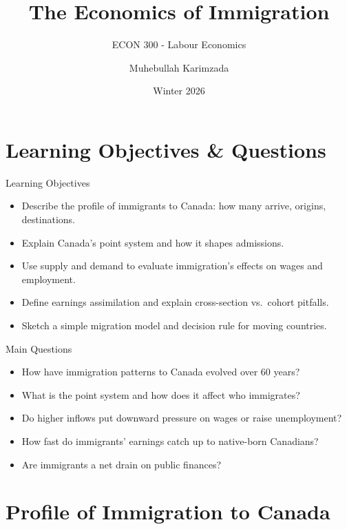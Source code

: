 \documentclass[aspectratio=169]{beamer}
\title{\textbf{The Economics of Immigration  \vspace{.5cm}\\  }}
\subtitle{ {\large ECON 300 - Labour Economics}}
\author{Muhebullah Karimzada}
\date{Winter 2026}
\begin{document}
\begin{frame}[plain]
  \titlepage
\end{frame}

\section{Learning Objectives \& Questions}

\begin{frame}{Learning Objectives}
\transfade
\begin{itemize}[<+->]
  \item Describe the profile of immigrants to Canada: how many arrive, origins, destinations.
  \item Explain Canada’s point system and how it shapes admissions.
  \item Use supply and demand to evaluate immigration’s effects on wages and employment.
  \item Define earnings assimilation and explain cross-section vs.\ cohort pitfalls.
  \item Sketch a simple migration model and decision rule for moving countries.
\end{itemize}
\end{frame}

\begin{frame}{Main Questions}
\transfade
\begin{itemize}[<+->]
  \item How have immigration patterns to Canada evolved over 60 years?
  \item What is the point system and how does it affect who immigrates?
  \item Do higher inflows put downward pressure on wages or raise unemployment?
  \item How fast do immigrants’ earnings catch up to native-born Canadians?
  \item Are immigrants a net drain on public finances?
\end{itemize}
\end{frame}

\section{Profile of Immigration to Canada}
\end{document}
